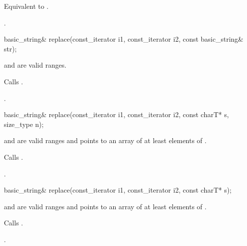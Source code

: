 \begin{itemdescr}
\pnum
\effects Equivalent to .

\pnum
\returns
{}.
\end{itemdescr}

%
%
\begin{itemdecl}
basic_string& replace(const_iterator i1, const_iterator i2, const basic_string& str);
\end{itemdecl}

\begin{itemdescr}
\pnum
\requires
{} and  are valid ranges.

\pnum
\effects
Calls .

\pnum
\returns
{}.
\end{itemdescr}

%
%
\begin{itemdecl}
basic_string&
  replace(const_iterator i1, const_iterator i2, const charT* s, size_type n);
\end{itemdecl}

\begin{itemdescr}
\pnum
\requires {} and  are valid ranges and
 points to an array of at least  elements of .

\pnum
\effects Calls .

\pnum
\returns
{}.
\end{itemdescr}

%
%
\begin{itemdecl}
basic_string& replace(const_iterator i1, const_iterator i2, const charT* s);
\end{itemdecl}

\begin{itemdescr}
\pnum
\requires {} and  are valid ranges and
 points to an array of at least 
elements of .

\pnum
\effects Calls .

\pnum
\returns
{}.
\end{itemdescr}


